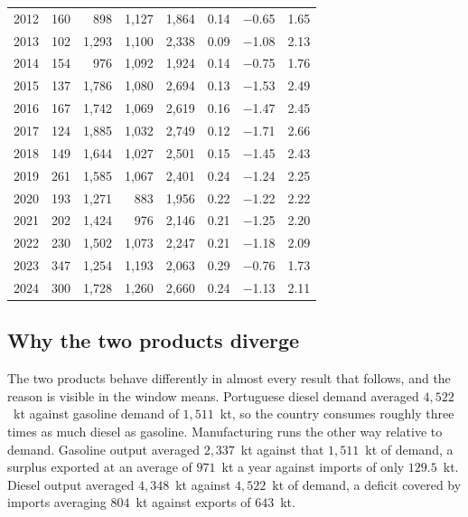 \documentclass[11pt,a4paper]{article}
\begin{document}
\begin{table}[htbp]
\begin{tabular}{rrrrrrrr}
2012 & 160 & 898 & 1{,}127 & 1{,}864 & 0.14 & $-$0.65 & 1.65 \\
2013 & 102 & 1{,}293 & 1{,}100 & 2{,}338 & 0.09 & $-$1.08 & 2.13 \\
2014 & 154 & 976 & 1{,}092 & 1{,}924 & 0.14 & $-$0.75 & 1.76 \\
2015 & 137 & 1{,}786 & 1{,}080 & 2{,}694 & 0.13 & $-$1.53 & 2.49 \\
2016 & 167 & 1{,}742 & 1{,}069 & 2{,}619 & 0.16 & $-$1.47 & 2.45 \\
2017 & 124 & 1{,}885 & 1{,}032 & 2{,}749 & 0.12 & $-$1.71 & 2.66 \\
2018 & 149 & 1{,}644 & 1{,}027 & 2{,}501 & 0.15 & $-$1.45 & 2.43 \\
2019 & 261 & 1{,}585 & 1{,}067 & 2{,}401 & 0.24 & $-$1.24 & 2.25 \\
2020 & 193 & 1{,}271 & 883 & 1{,}956 & 0.22 & $-$1.22 & 2.22 \\
\midrule
2021 & 202 & 1{,}424 & 976 & 2{,}146 & 0.21 & $-$1.25 & 2.20 \\
\midrule
2022 & 230 & 1{,}502 & 1{,}073 & 2{,}247 & 0.21 & $-$1.18 & 2.09 \\
2023 & 347 & 1{,}254 & 1{,}193 & 2{,}063 & 0.29 & $-$0.76 & 1.73 \\
2024 & 300 & 1{,}728 & 1{,}260 & 2{,}660 & 0.24 & $-$1.13 & 2.11 \\
\bottomrule
\end{tabular}
\end{table}

\subsection{Why the two products diverge}
\label{sec:mechanism}

The two products behave differently in almost every result that follows, and the reason is
visible in the window means. Portuguese diesel demand averaged $4{,}522$~kt against gasoline
demand of $1{,}511$~kt, so the country consumes roughly three times as much diesel as gasoline.
Manufacturing runs the other way relative to demand. Gasoline output averaged $2{,}337$~kt
against that $1{,}511$~kt of demand, a surplus exported at an average of $971$~kt a year
against imports of only $129.5$~kt. Diesel output averaged $4{,}348$~kt against $4{,}522$~kt of
demand, a deficit covered by imports averaging $804$~kt against exports of $643$~kt.
\end{document}
